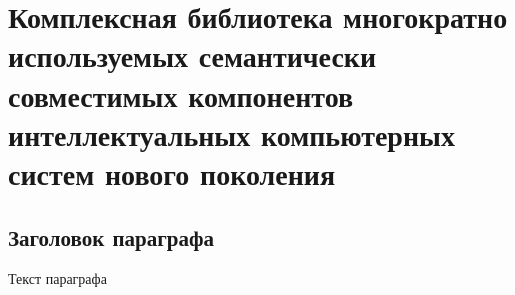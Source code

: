 \chapter{Комплексная библиотека многократно используемых семантически совместимых компонентов интеллектуальных компьютерных систем нового поколения}
\label{chapter_library}


\section{Заголовок параграфа}
Текст параграфа

%